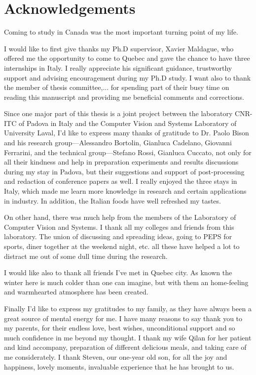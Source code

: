 \chapter*{Acknowledgements}         %

Coming to study in Canada was the most important turning point of my life.

I would like to first give thanks my Ph.D supervisor, Xavier Maldague, who offered me the opportunity to come to Quebec and gave the chance to have three internships in Italy. I really appreciate his significant guidance, trustworthy support and advising encouragement during my Ph.D study. I want also to thank the member of thesis committee,... for spending part of their busy time on reading this manuscript and providing me beneficial comments and corrections.


Since one major part of this thesis is a joint project between the laboratory CNR-ITC of Padova in Italy and the Computer Vision and Systems Laboratory of University Laval, I’d like to express many thanks of gratitude to Dr. Paolo Bison and his research group—Alessandro Bortolin, Gianluca Cadelano, Giovanni Ferrarini, and the technical group—Stefano Rossi, Gianluca Cuccato, not only for all their kindness and help in preparation experiments and results discussions during my stay in Padova, but their suggestions and support of post-processing and redaction of conference papers as well. I really enjoyed the three stays in Italy, which made me learn more knowledge in research and certain applications in industry. In addition, the Italian foods have well refreshed my tastes.

On other hand, there was much help from the members of the Laboratory of Computer Vision and Systems. I thank all my colleges and friends from this laboratory. The union of discussing and spreading ideas, going to PEPS for sports, diner together at the weekend night, etc. all these have helped a lot to distract me out of some dull time during the research.

I would like also to thank all friends I've met in Quebec city. As known the winter here is much colder than one can imagine, but with them an home-feeling and warmhearted atmosphere has been created. 

Finally I'd like to express my gratitudes to my family, as they have always been a great source of mental energy for me. I have many reasons to say thank you to my parents, for their endless love, best wishes, unconditional support and so much confidence in me beyond my thought. I thank my wife Qilan for her patient and kind accompany, preparation of different delicious meals, and taking care of me considerately. I thank Steven, our one-year old son, for all the joy and happiness, lovely moments, invaluable experience that he has brought to us. 
